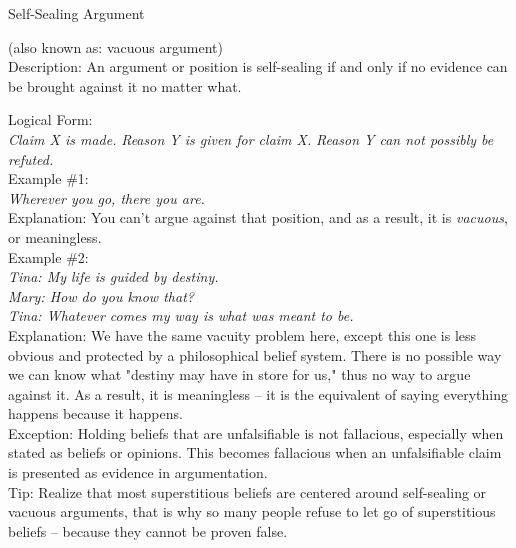 \documentclass[a4paper,12pt,single,pdftex]{scrbook}
\begin{document}
  

Self-Sealing Argument
    
      (also known as: vacuous argument)
    \\

  
    Description: An argument or position is self-sealing if and only if no evidence can be brought against it no matter what.

    
      Logical Form:
    \\

    
      {\em Claim X is made.} \newline
{\em Reason Y is given for claim X.} \newline
{\em Reason Y can not possibly be refuted.}
    \\

    
      Example \#1:
    \\

    
      {\em Wherever you go, there you are.}
    \\

    
      Explanation: You can’t argue against that position, and as a result, it is {\it vacuous}, or meaningless. 
    \\

    
      Example \#2:
    \\

    
      {\em Tina: My life is guided by destiny.}
    \\

    
      {\em Mary: How do you know that?}
    \\

    
      {\em Tina: Whatever comes my way is what was meant to be.}
    \\

    
      Explanation: We have the same vacuity problem here, except this one is less obvious and protected by a philosophical belief system.  There is no possible way we can know what "destiny may have in store for us," thus no way to argue against it.  As a result, it is meaningless -- it is the equivalent of saying everything happens because it happens.
    \\

    
      Exception: Holding beliefs that are unfalsifiable is not fallacious, especially when stated as beliefs or opinions. This becomes fallacious when an unfalsifiable claim is presented as evidence in argumentation.
    \\

    
      Tip: Realize that most superstitious beliefs are centered around self-sealing or vacuous arguments, that is why so many people refuse to let go of superstitious beliefs -- because they cannot be proven false.
    \\
\end{document}
